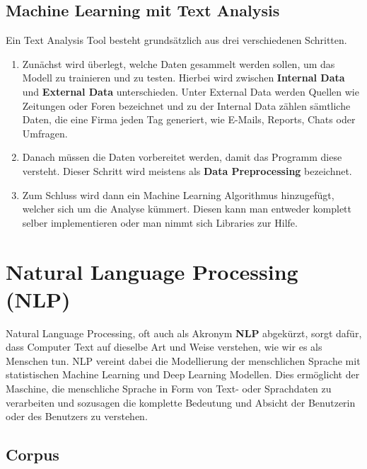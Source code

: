 \subsection{Machine Learning mit Text Analysis}

Ein Text Analysis Tool besteht grundsätzlich aus drei verschiedenen Schritten.

\begin{enumerate}
    \item Zunächst wird überlegt, welche Daten gesammelt werden sollen, um das Modell zu trainieren und zu testen.
    Hierbei wird zwischen \textbf{Internal Data} und \textbf{External Data} unterschieden.
    Unter External Data werden Quellen wie Zeitungen oder Foren bezeichnet und zu der Internal Data zählen sämtliche Daten, die eine Firma jeden Tag generiert, wie E-Mails, Reports, Chats oder Umfragen.
    \item Danach müssen die Daten vorbereitet werden, damit das Programm diese versteht.
    Dieser Schritt wird meistens als \textbf{Data Preprocessing} bezeichnet.
    \item Zum Schluss wird dann ein Machine Learning Algorithmus hinzugefügt, welcher sich um die Analyse kümmert.
    Diesen kann man entweder komplett selber implementieren oder man nimmt sich Libraries zur Hilfe.\cite{machineLearningTextAnalysis}
\end{enumerate}

\section{Natural Language Processing (NLP)}\label{subsec:natural-language-processing}

Natural Language Processing, oft auch als Akronym \textbf{NLP} abgekürzt, sorgt dafür, dass Computer Text auf dieselbe Art und Weise verstehen, wie wir es als Menschen tun.
NLP vereint dabei die Modellierung der menschlichen Sprache mit statistischen Machine Learning und Deep Learning Modellen.
Dies ermöglicht der Maschine, die menschliche Sprache in Form von Text- oder Sprachdaten zu verarbeiten und sozusagen die komplette Bedeutung und Absicht der Benutzerin oder des Benutzers zu verstehen.\cite{naturalLanguageProcessingIBM}

\subsection{Corpus}

